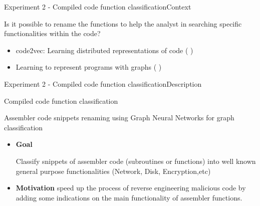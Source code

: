 \documentclass[xcolor=table]{beamer}
\begin{document}
\begin{frame}{Experiment 2 - Compiled code function classification}{Context}


Is it possible to rename the functions to help the analyst in searching specific functionalities within the code?


\begin{itemize}
    \item code2vec: Learning distributed representations of code (\citep{code2vec} )
    \item Learning to represent programs with graphs (\citep{139} )
\end{itemize}


% 
% 






\end{frame}




\begin{frame}{Experiment 2 - Compiled code function classification}{Description}

\begin{block}{
    Compiled code function classification
     }
    {
        Assembler code snippets renaming using Graph Neural Networks for graph classification


    }\end{block}

\begin{itemize}
\item \textbf{Goal}
       
        Classify snippets of assembler code (subroutines or functions) into well known general purpose functionalities (Network, Disk, Encryption,etc)

\item \textbf{Motivation} speed up the process of reverse engineering malicious code by adding some indications on the main functionality of assembler functions.
\end{itemize}


\end{frame}
\end{document}
